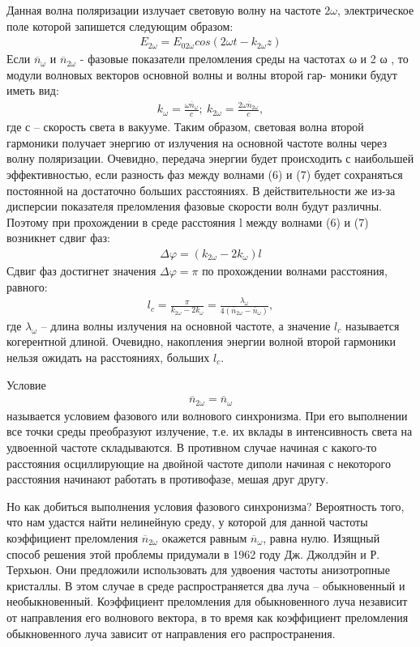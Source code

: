 \documentclass[twocolumn]{article}
\begin{document}
Данная волна поляризации излучает световую волну на частоте $2 \omega$,
электрическое поле которой запишется следующим образом:\begin{align}
E_{2\omega} = E_{02\omega}cos(2\omega t - k_{2\omega} z)
\end{align} Если $\overline{n}_\omega$ и $\overline{n}_{2\omega}$ - фазовые показатели преломления среды на частотах ω и
2 ω , то модули волновых векторов основной волны и волны второй гар-
моники будут иметь вид:\begin{align}
k_\omega = \frac{\omega \overline{n}_\omega}{c};\ k_{2\omega} = \frac{{2\omega} \overline{n}_{2\omega}}{c},
\end{align} где с – скорость света в вакууме. Таким образом, световая волна второй гармоники получает
энергию от излучения на основной частоте волны через волну поляризации. Очевидно, передача энергии будет происходить с наибольшей эффективностью, если разность фаз между волнами (6) и (7) будет сохраняться постоянной на достаточно больших расстояниях. В действительности же из-за дисперсии показателя преломления фазовые скорости волн будут различны. Поэтому при прохождении в среде
расстояния l между волнами (6) и (7) возникнет сдвиг фаз:\begin{align}
\Delta \varphi = (k_{2\omega} - 2k_\omega)l
\end{align} Сдвиг фаз достигнет значения $\Delta \varphi = \pi$  по прохождении волнами расстояния, равного:\begin{align}
l_c = \frac{\pi}{k_{2\omega} - 2k_\omega} = \frac{\lambda_\omega}{4(\overline{n}_{2\omega}-\overline{n}_\omega)},
\end{align} где $\lambda_\omega$ – длина волны излучения на основной частоте, а значение $l_c$ называется когерентной длиной. Очевидно, накопления энергии волной
второй гармоники нельзя ожидать на расстояниях, больших $l_c$. 

Условие \begin{align}
\overline{n}_{2\omega} = \overline{n}_\omega
\end{align} называется условием фазового или волнового синхронизма. При его выполнении все точки среды преобразуют излучение, т.е. их вклады в интенсивность света на удвоенной частоте складываются. В противном случае начиная с какого-то расстояния осциллирующие на двойной частоте диполи начиная с некоторого расстояния начинают работать в противофазе, мешая друг другу.


Но как добиться выполнения условия фазового синхронизма? Вероятность того, что нам удастся найти нелинейную среду, у которой для данной частоты коэффициент преломления $\overline{n}_{2\omega}$ окажется равным $\overline{n}_\omega$, равна нулю. Изящный способ решения этой проблемы придумали в 1962 году Дж. Джолдэйн и Р. Терхьюн. Они предложили использовать для удвоения частоты анизотропные кристаллы. В этом случае в среде распространяется два луча – обыкновенный и необыкновенный. Коэффициент преломления для обыкновенного луча независит от направления его волнового вектора, в то время как коэффициент преломления обыкновенного луча зависит от направления его распространения.
\end{document}
